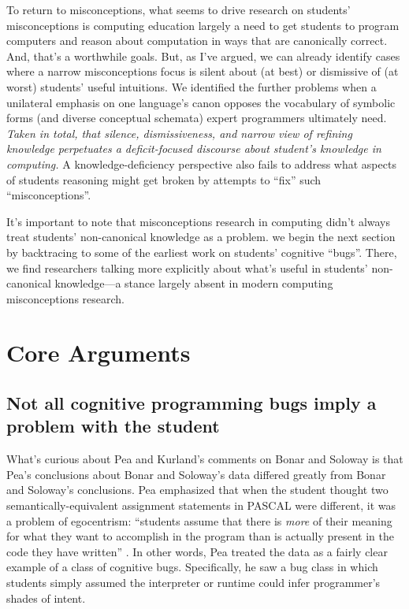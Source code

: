 To return to misconceptions, what seems to drive research on students'
misconceptions is computing education largely a need to get students to program computers
and reason about computation in ways that are canonically correct. And,
that's a worthwhile goals. But, as I've argued, we can
already identify cases where a narrow misconceptions focus is silent
about (at best) or dismissive of (at worst) students' useful intuitions. We identified
the further problems when a unilateral emphasis on one language's canon
opposes the vocabulary of symbolic forms (and diverse conceptual
schemata) expert programmers ultimately need. \emph{Taken in
total, that silence, dismissiveness, and narrow view of refining
knowledge perpetuates a deficit-focused discourse about student's
knowledge in computing.} A knowledge-deficiency perspective also fails to address what aspects of
students reasoning might get broken by attempts to ``fix'' such
``misconceptions''.

It's important to note that misconceptions research in computing didn't
always treat students' non-canonical knowledge as a problem. we begin the
next section by backtracing to some of the earliest work on students'
cognitive ``bugs''. There, we find researchers talking more explicitly
about what's useful in students' non-canonical knowledge---a stance
largely absent in modern computing misconceptions research.

\section{Core Arguments}\label{core-arguments}

\subsection{Not all cognitive programming bugs imply a problem with
the
student}\label{not-all-cognitive-programming-bugs-imply-a-problem-with-the-student}

What's curious about Pea and Kurland's \cite{pea_languageindependent_1986} comments on Bonar and Soloway \cite{bonar_uncovering_1983} is
that Pea's conclusions \cite{pea_languageindependent_1986} about Bonar and Soloway's data differed greatly from Bonar and Soloway's conclusions. Pea emphasized that when the student thought two
semantically-equivalent assignment statements in PASCAL were different,
it was a problem of egocentrism: ``students assume that there is
\emph{more} of their meaning for what they want to accomplish in the
program than is actually present in the code they have written'' \cite{pea_languageindependent_1986}. In other words, Pea treated the data as a fairly clear example of a
class of cognitive bugs. Specifically, he saw a bug class in which students simply
assumed the interpreter or runtime could infer programmer's shades
of intent.


